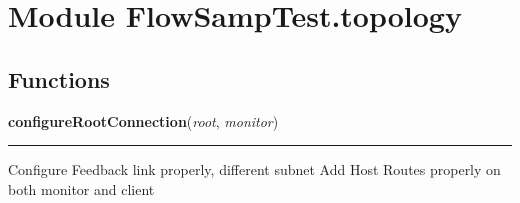 %
%
%


\section{Module FlowSampTest.topology}

    \label{FlowSampTest:topology}


  \subsection{Functions}

    \label{FlowSampTest:topology:configureRootConnection}

    \vspace{0.5ex}

\hspace{.8\funcindent}\begin{boxedminipage}{\funcwidth}

    \raggedright \textbf{configureRootConnection}(\textit{root}, \textit{monitor})

    \vspace{-1.5ex}

    \rule{\textwidth}{0.5\fboxrule}
\setlength{\parskip}{2ex}
    Configure Feedback link properly, different subnet Add Host Routes 
    properly on both monitor and client

\setlength{\parskip}{1ex}
    \end{boxedminipage}



